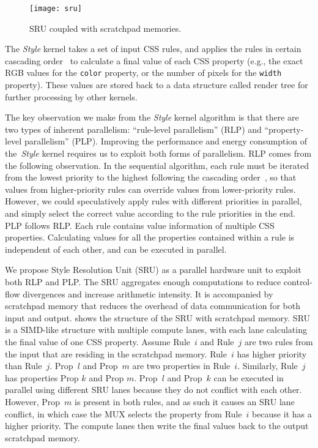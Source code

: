 \begin{figure}[t]
  \centering
  \texttt{[image: sru]}
  \caption{\small{SRU coupled with scratchpad memories.}}
  \label{fig:sru}
\end{figure}

The \textit{Style} kernel takes a set of input CSS rules, and applies the rules in certain cascading order~\cite{cascading} to calculate a final value of each CSS property (e.g., the exact RGB values for the \texttt{color} property, or the number of pixels for the \texttt{width} property). These values are stored back to a data structure called render tree for further processing by other kernels.

The key observation we make from the \textit{Style} kernel algorithm is that there are two types of inherent parallelism: ``rule-level parallelism'' (RLP) and ``property-level parallelism'' (PLP). Improving the performance and energy consumption of the~\textit{Style} kernel requires us to exploit both forms of parallelism. RLP comes from the following observation. In the sequential algorithm, each rule must be iterated from the lowest priority to the highest following the cascading order~\cite{cascading}, so that values from higher-priority rules can override values from lower-priority rules. However, we could speculatively apply rules with different priorities in parallel, and simply select the correct value according to the rule priorities in the end. PLP follows RLP. Each rule contains value information of multiple CSS properties. Calculating values for all the properties contained within a rule is independent of each other, and can be executed in parallel.

We propose Style Resolution Unit (SRU) as a parallel hardware unit to exploit both RLP and PLP. The SRU aggregates enough computations to reduce control-flow divergences and increase arithmetic intensity. It is accompanied by scratchpad memory that reduces the overhead of data communication for both input and output.  shows the structure of the SRU with scratchpad memory. SRU is a SIMD-like structure with multiple compute lanes, with each lane calculating the final value of one CSS property. Assume Rule~$i$ and Rule~$j$ are two rules from the input that are residing in the scratchpad memory. Rule~$i$ has higher priority than Rule~$j$. Prop~$l$ and Prop~$m$ are two properties in Rule~$i$. Similarly, Rule~$j$ has properties Prop $k$ and Prop $m$. Prop~$l$ and Prop~$k$ can be executed in parallel using different SRU lanes because they do not conflict with each other. However, Prop~$m$ is present in both rules, and as such it causes an SRU lane conflict, in which case the MUX selects the property from Rule~$i$ because it has a higher priority. The compute lanes then write the final values back to the output scratchpad memory.

